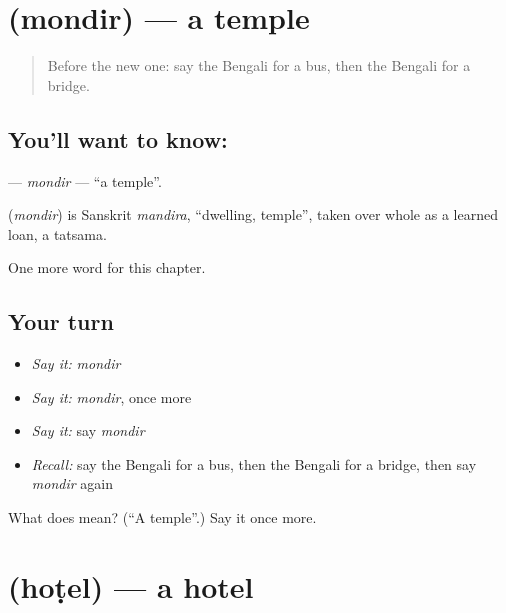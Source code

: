 \section[\texorpdfstring{\bn{মন্দির} (mondir)}{মন্দির (mondir)}]{ (mondir) — a temple}

\label{lesson:BN-C83-mondir}



\begin{quote}
Before the new one: say the Bengali for a bus, then the Bengali for a bridge.
\end{quote}

\subsection*{You'll want to know: }
\textbf{} — \emph{mondir} — \textquotedblleft{}a temple\textquotedblright{}.

\begin{cousinweb}
\textbf{} (\emph{mondir}) is Sanskrit \emph{mandira}, \textquotedblleft{}dwelling, temple\textquotedblright{}, taken over whole as a learned loan, a tatsama.
\end{cousinweb}

\begin{grammarlens}[title={What you've built}]
One more word for this chapter.
\end{grammarlens}

\subsection*{Your turn}
\begin{itemize}
\raggedright
  \item \emph{Say it:} \emph{mondir}
  \item \emph{Say it:} \emph{mondir}, once more
  \item \emph{Say it:} say \emph{mondir}
  \item \emph{Recall:} say the Bengali for a bus, then the Bengali for a bridge, then say \emph{mondir} again
\end{itemize}

\begin{tcolorbox}[breakable,colback=teal!4,colframe=teal!35!black,title={Before you move on}]
What does  mean? (\textquotedblleft{}A temple\textquotedblright{}.) Say it once more.
\end{tcolorbox}
\section[\texorpdfstring{\bn{হোটেল} (hoṭel)}{হোটেল (hoṭel)}]{ (hoṭel) — a hotel}

